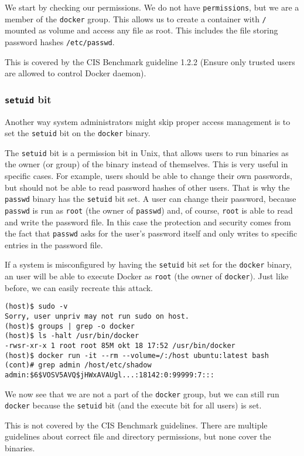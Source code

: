 We start by checking our permissions. We do not have \lstinline{permissions}, but we are a member of the \lstinline{docker} group. This allows us to create a container with \lstinline{/} mounted as volume and access any file as root. This includes the file storing password hashes \lstinline{/etc/passwd}.

\hfill

This is covered by the CIS Benchmark guideline 1.2.2 (Ensure only trusted users are allowed to control Docker daemon).

\subsubsection{\texorpdfstring{\lstinline{setuid}}{setuid} bit}
Another way system administrators might skip proper access management is to set the \lstinline{setuid} bit on the \lstinline{docker} binary.

\hfill

The \lstinline{setuid} bit is a permission bit in Unix, that allows users to run binaries as the owner (or group) of the binary instead of themselves.
This is very useful in specific cases. For example, users should be able to change their own passwords, but should not be able to read password hashes of other users. That is why the \lstinline{passwd} binary has the \lstinline{setuid} bit set. A user can change their password, because \lstinline{passwd} is run as \lstinline{root} (the owner of \lstinline{passwd}) and, of course, \lstinline{root} is able to read and write the password file. In this case the protection and security comes from the fact that \lstinline{passwd} asks for the user's password itself and only writes to specific entries in the password file.

\hfill

If a system is misconfigured by having the \lstinline{setuid} bit set for the \lstinline{docker} binary, an user will be able to execute Docker as \lstinline{root} (the owner of \lstinline{docker}). Just like before, we can easily recreate this attack.

\begin{lstlisting}[caption={Docker \lstinline{setuid} exploit example},captionpos=b]
(host)$ sudo -v
Sorry, user unpriv may not run sudo on host.
(host)$ groups | grep -o docker
(host)$ ls -halt /usr/bin/docker
-rwsr-xr-x 1 root root 85M okt 18 17:52 /usr/bin/docker
(host)$ docker run -it --rm --volume=/:/host ubuntu:latest bash
(cont)# grep admin /host/etc/shadow
admin:$6$VOSV5AVQ$jHWxAVAUgl...:18142:0:99999:7:::
\end{lstlisting}

We now see that we are not a part of the \lstinline{docker} group, but we can still run \lstinline{docker} because the \lstinline{setuid} bit (and the execute bit for all users) is set.

\hfill

This is not covered by the CIS Benchmark guidelines. There are multiple guidelines about correct file and directory permissions, but none cover the binaries.
